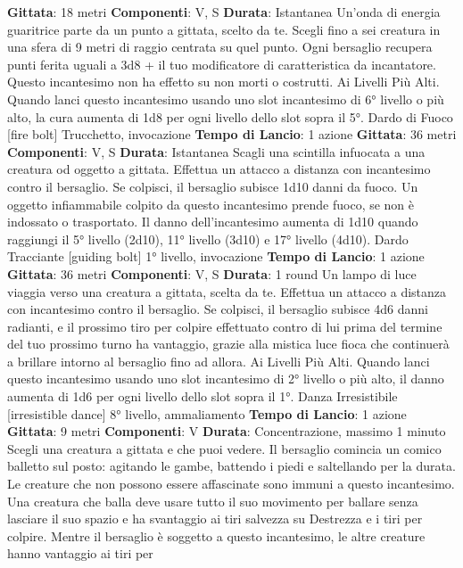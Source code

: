 \begin{multicols}{2}
\textbf{Gittata}: 18 metri
\textbf{Componenti}: V, S
\textbf{Durata}: Istantanea
Un’onda di energia guaritrice parte da un punto a
gittata, scelto da te. Scegli fino a sei creatura in una
sfera di 9 metri di raggio centrata su quel punto. Ogni
bersaglio recupera punti ferita uguali a 3d8 + il tuo
modificatore di caratteristica da incantatore. Questo
incantesimo non ha effetto su non morti o costrutti.
Ai Livelli Più Alti. Quando lanci questo incantesimo
usando uno slot incantesimo di 6° livello o più alto, la
cura aumenta di 1d8 per ogni livello dello slot sopra il
5°.
Dardo di Fuoco
[fire bolt]
Trucchetto, invocazione
\textbf{Tempo di Lancio}: 1 azione
\textbf{Gittata}: 36 metri
\textbf{Componenti}: V, S
\textbf{Durata}: Istantanea
Scagli una scintilla infuocata a una creatura od oggetto
a gittata. Effettua un attacco a distanza con incantesimo
contro il bersaglio. Se colpisci, il bersaglio subisce 1d10
danni da fuoco. Un oggetto infiammabile colpito da
questo incantesimo prende fuoco, se non è indossato o
trasportato.
Il danno dell’incantesimo aumenta di 1d10 quando
raggiungi il 5° livello (2d10), 11° livello (3d10) e 17°
livello (4d10).
Dardo Tracciante
[guiding bolt]
1° livello, invocazione
\textbf{Tempo di Lancio}: 1 azione
\textbf{Gittata}: 36 metri
\textbf{Componenti}: V, S
\textbf{Durata}: 1 round
Un lampo di luce viaggia verso una creatura a gittata,
scelta da te. Effettua un attacco a distanza con
incantesimo contro il bersaglio. Se colpisci, il bersaglio
subisce 4d6 danni radianti, e il prossimo tiro per colpire
effettuato contro di lui prima del termine del tuo
prossimo turno ha vantaggio, grazie alla mistica luce
fioca che continuerà a brillare intorno al bersaglio fino
ad allora.
Ai Livelli Più Alti. Quando lanci questo incantesimo
usando uno slot incantesimo di 2° livello o più alto, il
danno aumenta di 1d6 per ogni livello dello slot sopra il
1°.
Danza Irresistibile
[irresistible dance]
8° livello, ammaliamento
\textbf{Tempo di Lancio}: 1 azione
\textbf{Gittata}: 9 metri
\textbf{Componenti}: V
\textbf{Durata}: Concentrazione, massimo 1 minuto
Scegli una creatura a gittata e che puoi vedere. Il
bersaglio comincia un comico balletto sul posto:
agitando le gambe, battendo i piedi e saltellando per la
durata. Le creature che non possono essere affascinate
sono immuni a questo incantesimo.
Una creatura che balla deve usare tutto il suo
movimento per ballare senza lasciare il suo spazio e ha
svantaggio ai tiri salvezza su Destrezza e i tiri per
colpire. Mentre il bersaglio è soggetto a questo
incantesimo, le altre creature hanno vantaggio ai tiri per

\end{multicols}
